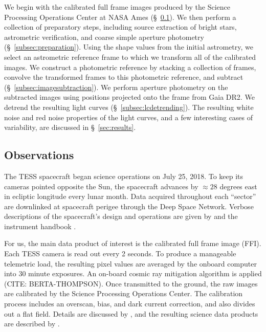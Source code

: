 \documentclass[12pt,twocolumn,tighten]{aastex62}
\begin{document}
We begin with the calibrated full frame images produced by the Science
Processing Operations Center at NASA Ames (\S~\ref{subsec:observations}).
We then perform a collection of
preparatory steps, including source extraction of bright stars,
astrometric verification, and coarse simple aperture
photometry (\S~\ref{subsec:preparation}).  Using the shape values from
the initial astrometry, we select an astrometric reference frame to
which we transform all of the calibrated images.  We construct a
photometric reference by stacking a collection of frames,
convolve the transformed frames to this photometric reference, and
subtract (\S~\ref{subsec:imagesubtraction}).  We perform aperture
photometry on the subtracted images using positions projected onto the
frame from Gaia DR2.  
We detrend the resulting light curves
(\S~\ref{subsec:lcdetrending}).  The resulting white noise and red noise properties
of the light curves, and a few
interesting cases of variability, are discussed in \S~\ref{sec:results}.




\subsection{Observations}
\label{subsec:observations}


The TESS spacecraft began science operations on July 25, 2018.  To
keep its cameras pointed opposite the Sun, the spacecraft advances by
$\approx$$28$ degrees east in ecliptic longitude every lunar month.  Data
acquired throughout each ``sector'' are downlinked at spacecraft
perigee through the Deep Space Network.  Verbose descriptions of the
spacecraft's design and operations are given by
\citet{ricker_transiting_2015} and the instrument handbook
\citep{vanderspek_2018}.

For us, the main data product of interest is the calibrated full frame
image (FFI).  Each TESS camera is read out every 2 seconds.  To produce
a manageable telemetric load, the resulting pixel values are averaged
by the onboard computer into 30 minute exposures. An on-board cosmic
ray mitigation algorithm is applied (CITE: BERTA-THOMPSON). Once
transmitted to the ground, the raw images are calibrated by the
Science Processing Operations Center.  The calibration process
includes an overscan, bias, and dark current correction, and also
divides out a flat field.  Details are discussed by
\citet{clarke_kepler_2017}, and the resulting science data products
are described by \citet{tess_data_product_description_2018}.
\end{document}
